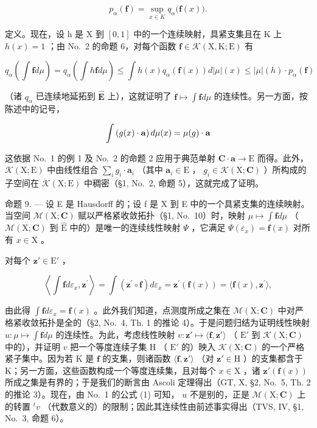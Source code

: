 \[
p _ {\alpha} (\mathbf {f}) = \sup _ {x \in K} q _ {\alpha} \bigl (\mathbf {f} (x) \bigr).
\]

定义。现在，设 h 是 X 到 \([0,1]\) 中的一个连续映射，具紧支集且在 K 上 \(h(x)=1\) ；由 No.~2 的命题 6，对每个函数 \(\mathbf{f}\in\mathcal{K}(\mathrm{X},\mathrm{K};\mathrm{E})\) 有

\[
q _ {\alpha} \left(\int \mathbf {f} d \mu\right) = q _ {\alpha} \left(\int h \mathbf {f} d \mu\right) \leqslant \int h (x) q _ {\alpha} (\mathbf {f} (x)) d | \mu | (x) \leqslant | \mu | (h) \cdot p _ {\alpha} (\mathbf {f})
\]

（诸 \(q_{\alpha}\) 已连续地延拓到 \(\widehat{\mathbf{E}}\) 上），这就证明了 \(\mathbf{f} \mapsto \int \mathbf{f} d\mu\) 的连续性。另一方面，按陈述中的记号，

\[
\int \left(g (x) \cdot {\bf a}\right) d \mu (x) = \mu (g) \cdot {\bf a}
\]

这依据 No.~1 的例 1 及 No.~2 的命题 2 应用于典范单射 \(\mathbf{C} \cdot \mathbf{a} \to \mathrm{E}\) 而得。此外， \(\mathcal{K}(\mathrm{X};\mathrm{E})\) 中由线性组合 \(\sum_{i} g_i \cdot \mathbf{a}_i\) （其中 \(\mathbf{a}_i \in \mathrm{E}\) ， \(g_i \in \mathcal{K}(\mathrm{X};\mathbf{C})\) ）所构成的子空间在 \(\mathcal{K}(\mathrm{X};\mathrm{E})\) 中稠密（§1, No.~2, 命题 5），这就完成了证明。

命题 9. --- 设 E 是 Hausdorff 的；设 f 是 X 到 E 中的一个具紧支集的连续映射。当空间 \(\mathcal{M}(\mathrm{X};\mathbf{C})\) 赋以严格紧收敛拓扑（§1, No.~10）时，映射 \(\mu \mapsto \int \mathbf{f} d\mu\) （ \(\mathcal{M}(\mathrm{X};\mathbf{C})\) 到 \(\widehat{\mathrm{E}}\) 中的）是唯一的连续线性映射 \(\Psi\) ，它满足 \(\Psi(\varepsilon_x) = \mathbf{f}(x)\) 对所有 \(x \in \mathrm{X}\) 。

对每个 \(\mathbf{z}' \in \mathrm{E}'\) ，

\[
\left\langle \int \mathbf {f} d \varepsilon_ {x}, \mathbf {z} ^ {\prime} \right\rangle = \int (\mathbf {z} ^ {\prime} \circ \mathbf {f}) d \varepsilon_ {x} = \mathbf {z} ^ {\prime} (\mathbf {f} (x)) = \langle \mathbf {f} (x), \mathbf {z} ^ {\prime} \rangle ,
\]

由此得 \(\int \mathbf{f} d\varepsilon_x = \mathbf{f}(x)\) 。此外我们知道，点测度所成之集在 \(\mathcal{M}(\mathrm{X};\mathbf{C})\) 中对严格紧收敛拓扑是全的（§2, No.~4, Th. 1 的推论 4）。于是问题归结为证明线性映射 \(u: \mu \mapsto \int \mathbf{f} d\mu\) 的连续性。为此，考虑线性映射 \(v: \mathbf{z}' \mapsto \langle \mathbf{f}, \mathbf{z}' \rangle\) （ \(\mathrm{E}'\) 到 \(\mathcal{K}(\mathrm{X};\mathbf{C})\) 中的），并证明 \(v\) 把一个等度连续子集 H （ \(\mathrm{E}'\) 的）映入 \(\mathcal{K}(\mathrm{X};\mathbf{C})\) 的一个严格紧子集中。因为若 K 是 \(\mathbf{f}\) 的支集，则诸函数 \(\langle \mathbf{f}, \mathbf{z}' \rangle\) （对 \(\mathbf{z}' \in \mathrm{H}\) ）的支集都含于 K；另一方面，这些函数构成一个等度连续集，且对每个 \(x \in \mathrm{X}\) ，诸 \(\mathbf{z}'(\mathbf{f}(x))\) 所成之集是有界的；于是我们的断言由 Ascoli 定理得出（GT, X, §2, No.~5, Th. 2 的推论 3）。现在，由 No.~1 的公式 (1) 可知， \(u\) 不是别的，正是 \(\mathcal{M}(\mathrm{X};\mathbf{C})\) 上的转置 \(^t v\) （代数意义的）的限制；因此其连续性由前述事实得出（TVS, IV, §1, No.~3, 命题 6）。

